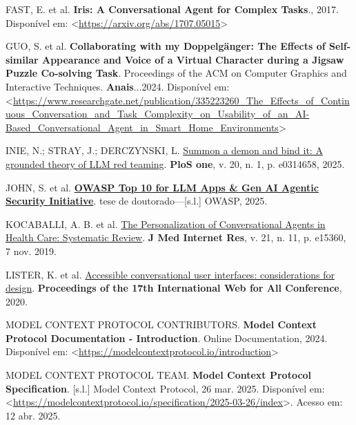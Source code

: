 \documentclass[
]{article}
\newlength{\cslhangindent}
\newenvironment{CSLReferences}[2] %
 {\begin{list}{}{%
  \setlength{\itemindent}{0pt}
  \setlength{\leftmargin}{0pt}
  \setlength{\parsep}{0pt}
  \ifodd #1
   \setlength{\leftmargin}{\cslhangindent}
   \setlength{\itemindent}{-1\cslhangindent}
  \fi
  \setlength{\itemsep}{#2\baselineskip}}}
 {\end{list}}
\begin{document}
\begin{CSLReferences}{0}{1}
FAST, E. et al. \textbf{Iris: A Conversational Agent for Complex
Tasks}., 2017. Disponível em:
\textless{}\url{https://arxiv.org/abs/1707.05015}\textgreater{}

GUO, S. et al. \textbf{Collaborating with my Doppelgänger: The Effects
of Self-similar Appearance and Voice of a Virtual Character during a
Jigsaw Puzzle Co-solving Task}. Proceedings of the ACM on Computer
Graphics and Interactive Techniques. \textbf{Anais}...2024. Disponível
em:
\textless{}\url{https://www.researchgate.net/publication/335223260_The_Effects_of_Continuous_Conversation_and_Task_Complexity_on_Usability_of_an_AI-Based_Conversational_Agent_in_Smart_Home_Environments}\textgreater{}

INIE, N.; STRAY, J.; DERCZYNSKI, L.
\href{https://journals.plos.org/plosone/article?id=10.1371/journal.pone.0314658}{Summon
a demon and bind it: A grounded theory of LLM red teaming}. \textbf{PloS
one}, v. 20, n. 1, p. e0314658, 2025.

JOHN, S. et al.
\textbf{\href{https://genai.owasp.org/llmrisk/llm01-prompt-injection}{OWASP
Top 10 for LLM Apps \& Gen AI Agentic Security Initiative}}. tese de
doutorado---{[}s.l.{]} OWASP, 2025.

KOCABALLI, A. B. et al. \href{https://doi.org/10.2196/15360}{The
Personalization of Conversational Agents in Health Care: Systematic
Review}. \textbf{J Med Internet Res}, v. 21, n. 11, p. e15360, 7 nov.
2019.

LISTER, K. et al.
\href{https://api.semanticscholar.org/CorpusID:218539971}{Accessible
conversational user interfaces: considerations for design}.
\textbf{Proceedings of the 17th International Web for All Conference},
2020.

MODEL CONTEXT PROTOCOL CONTRIBUTORS. \textbf{{Model Context Protocol
Documentation - Introduction}}. Online Documentation, 2024. Disponível
em:
\textless{}\url{https://modelcontextprotocol.io/introduction}\textgreater{}

MODEL CONTEXT PROTOCOL TEAM. \textbf{Model Context Protocol
Specification}. {[}s.l.{]} Model Context Protocol, 26 mar. 2025.
Disponível em:
\textless{}\url{https://modelcontextprotocol.io/specification/2025-03-26/index}\textgreater.
Acesso em: 12 abr. 2025.


\end{CSLReferences}
\end{document}
